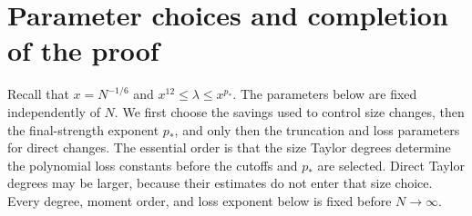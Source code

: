 \section{Parameter choices and completion of the proof}\label{sec:parameters}

Recall that \(x=N^{-1/6}\) and
\(x^{12}\le\lambda\le x^{p_*}\).  The parameters below are fixed
independently of \(N\).  We first choose the savings used to control
size changes, then the final-strength exponent \(p_*\), and only then
the truncation and loss parameters for direct changes. The essential
order is that the size Taylor degrees determine the polynomial loss
constants before the cutoffs and \(p_*\) are selected. Direct Taylor
degrees may be larger, because their estimates do not enter that size
choice. Every degree, moment order, and loss exponent below is fixed
before \(N\to\infty\).

